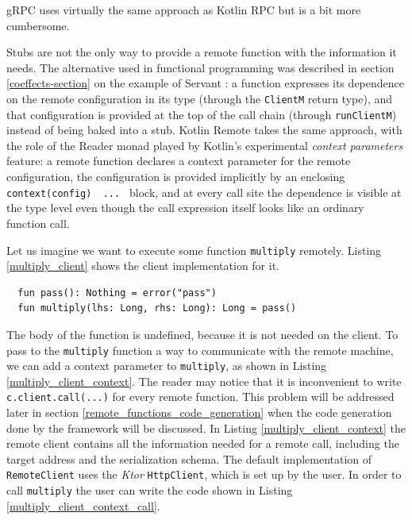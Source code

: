 \documentclass[a4paper,11pt,oneside]{article}
\newcommand{\term}[1]{\textit{#1}}
\newcommand{\kotlini}[1]{\texttt{#1}}
\begin{document}
gRPC uses virtually the same approach as Kotlin RPC but is a bit more cumbersome.

Stubs are not the only way to provide a remote function with the information it needs. The
alternative used in functional programming was described in section \ref{coeffects-section} on
the example of Servant \cite{noauthor_servant_nodate}: a function expresses its dependence on
the remote configuration in its type (through the \texttt{ClientM} return type),
and that configuration is provided at the top of the call chain (through
\texttt{runClientM}) instead of being baked into a stub. Kotlin Remote takes the
same approach, with the role of the Reader monad played by Kotlin's experimental \term{context
parameters} \cite{noauthor_keepproposalskeep-0367-context-parametersmd_nodate} feature: a
remote function declares a context parameter for the remote configuration, the configuration is
provided implicitly by an enclosing \kotlini{context(config) { ... }} block, and at every call
site the dependence is visible at the type level even though the call expression itself looks
like an ordinary function call.

Let us imagine we want to execute some function \kotlini{multiply} remotely. Listing \ref{multiply_client}
shows the client implementation for it.

\begin{listing}[!h]
  \begin{verbatim}
  fun pass(): Nothing = error("pass")
  fun multiply(lhs: Long, rhs: Long): Long = pass()
  \end{verbatim}
  \caption{Client part of multiply function}\label{multiply_client}
\end{listing}

The body of the function is undefined, because it is not needed on the client. To pass to the
\kotlini{multiply} function a way to communicate with the remote machine, we can add a context parameter
to \kotlini{multiply}, as shown in Listing \ref{multiply_client_context}. The reader may notice that it is
inconvenient to write \kotlini{c.client.call(...)} for every remote function. This problem will be
addressed later in section \ref{remote_functions_code_generation} when the code generation done by the
framework will be discussed. In Listing \ref{multiply_client_context} the remote client contains all the information needed for a remote call, including the target address and the
serialization schema. The default implementation of \kotlini{RemoteClient} uses the \term{Ktor}
\cite{noauthor_ktor_nodate} \kotlini{HttpClient}, which is set up by the user. In order to call
\kotlini{multiply} the user can write the code shown in Listing \ref{multiply_client_context_call}.
\end{document}
